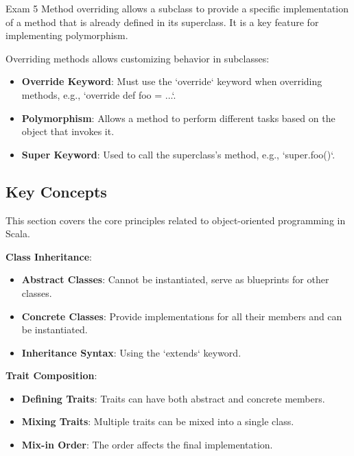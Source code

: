 \begin{examnotes}{Exam 5}
    Method overriding allows a subclass to provide a specific implementation of a method that is already defined in its superclass. It is a key feature for implementing polymorphism.
    
    \begin{highlight}
        Overriding methods allows customizing behavior in subclasses:
        \begin{itemize}
            \item \textbf{Override Keyword}: Must use the `override` keyword when overriding methods, e.g., `override def foo = ...`.
            \item \textbf{Polymorphism}: Allows a method to perform different tasks based on the object that invokes it.
            \item \textbf{Super Keyword}: Used to call the superclass's method, e.g., `super.foo()`.
        \end{itemize}
    \end{highlight}
    
    \subsection*{Key Concepts}
    
    \begin{highlight}
        This section covers the core principles related to object-oriented programming in Scala.
    
        \textbf{Class Inheritance}:
        \begin{itemize}
            \item \textbf{Abstract Classes}: Cannot be instantiated, serve as blueprints for other classes.
            \item \textbf{Concrete Classes}: Provide implementations for all their members and can be instantiated.
            \item \textbf{Inheritance Syntax}: Using the `extends` keyword.
        \end{itemize}
    
        \textbf{Trait Composition}:
        \begin{itemize}
            \item \textbf{Defining Traits}: Traits can have both abstract and concrete members.
            \item \textbf{Mixing Traits}: Multiple traits can be mixed into a single class.
            \item \textbf{Mix-in Order}: The order affects the final implementation.
        \end{itemize}
    

\end{highlight}
\end{examnotes}
